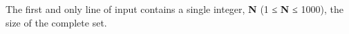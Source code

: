 The first and only line of input contains a single integer,\textbf{ N} (1 ≤ \textbf{N} ≤ 1000), the size of the complete set.